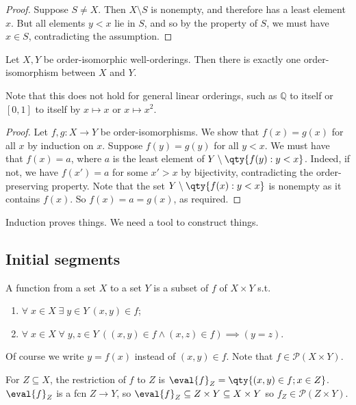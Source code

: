 \begin{proof}
    Suppose $S \neq X$.
    Then $X \setminus S$ is nonempty, and therefore has a least element $x$.
    But all elements $y < x$ lie in $S$, and so by the property of $S$, we must have $x \in S$, contradicting the assumption.
\end{proof}

\begin{proposition}
    Let $X, Y$ be order-isomorphic well-orderings.
    Then there is exactly one order-isomorphism between $X$ and $Y$.
\end{proposition}

Note that this does not hold for general linear orderings, such as $\mathbb Q$ to itself or $[0,1]$ to itself by $x \mapsto x$ or $x \mapsto x^2$.

\begin{proof}
    Let $f, g \colon X \to Y$ be order-isomorphisms.
    We show that $f(x) = g(x)$ for all $x$ by induction on $x$.
    Suppose $f(y) = g(y)$ for all $y < x$.
    We must have that $f(x) = a$, where $a$ is the least element of $Y \setminus \qty{f(y) : y < x}$.
    Indeed, if not, we have $f(x') = a$ for some $x' > x$ by bijectivity, contradicting the order-preserving property.
    Note that the set $Y \setminus \qty{f(x) : y < x}$ is nonempty as it contains $f(x)$.
    So $f(x) = a = g(x)$, as required.
\end{proof}

\begin{remark}
    Induction proves things.
    We need a tool to construct things.
\end{remark}

\subsection{Initial segments}

\begin{note}
    A function from a set $X$ to a set $Y$ is a subset of $f$ of $X \times Y$ s.t.
    \begin{enumerate}
        \item $\forall \; x \in X \; \exists \; y \in Y \ (x, y) \in f$;
        \item $\forall \; x \in X \; \forall \; y, z \in Y \ ((x, y) \in f \wedge (x, z) \in f) \implies (y = z)$.
    \end{enumerate}

    Of course we write $y = f(x)$ instead of $(x, y) \in f$.
    Note that $f \in \mathcal{P}(X \times Y)$.

    For $Z \subseteq X$, the restriction of $f$ to $Z$ is $\eval{f}_Z = \qty{(x, y) \in f ; x \in Z}$.
    $\eval{f}_Z$ is a fcn $Z \to Y$, so $\eval{f}_Z \subseteq Z \times Y \subseteq X \times Y$ so $f_Z \in \mathcal{P}(Z \times Y)$.
\end{note}

